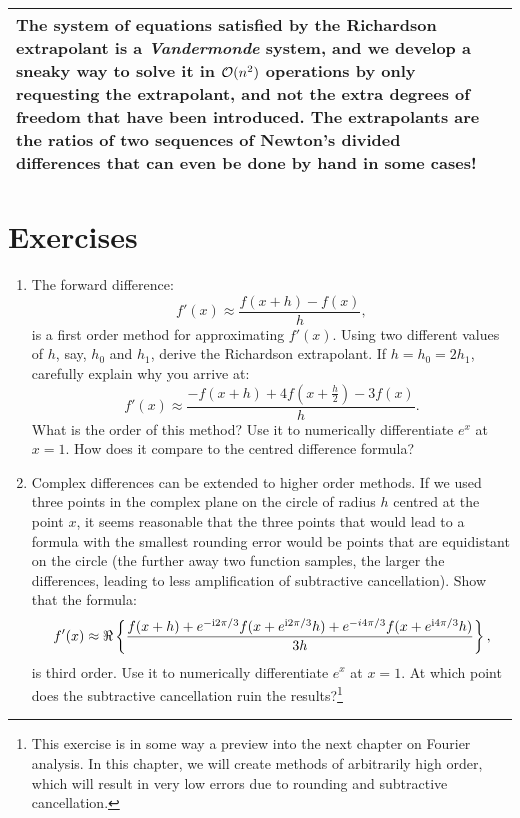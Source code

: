 \documentclass[11pt,letterpaper]{article}
\begin{document}
\begin{longtable}{p{}|p{}}
The system of equations satisfied by the Richardson extrapolant is a {\em Vandermonde} system, and we develop a sneaky way to solve it in $\mathcal{O}(n^2)$ operations by only requesting the extrapolant, and not the extra degrees of freedom that have been introduced. The extrapolants are the ratios of two sequences of Newton's divided differences that can even be done by hand in some cases!\\

\hline
\end{longtable}

\section*{Exercises}

\begin{enumerate}

\item The forward difference:
\[
f'(x) \approx \dfrac{f(x+h)-f(x)}{h},
\]
is a first order method for approximating $f'(x)$. Using two different values of $h$, say, $h_0$ and $h_1$, derive the Richardson extrapolant. If $h = h_0 = 2h_1$, carefully explain why you arrive at:
\[
f'(x) \approx \dfrac{-f(x+h)+4f(x+\tfrac{h}{2})-3f(x)}{h}.
\]
What is the order of this method? Use it to numerically differentiate $e^x$ at $x=1$. How does it compare to the centred difference formula?

\item Complex differences can be extended to higher order methods. If we used three points in the complex plane on the circle of radius $h$ centred at the point $x$, it seems reasonable that the three points that would lead to a formula with the smallest rounding error would be points that are equidistant on the circle (the further away two function samples, the larger the differences, leading to less amplification of subtractive cancellation). Show that the formula:
\[
f'(x) \approx \Re\left\{\dfrac{f(x+h)+e^{-{\rm i} 2\pi/3}f(x+e^{{\rm i}2\pi/3}h) + e^{-i4\pi/3}f(x+e^{{\rm i}4\pi/3}h)}{3h}\right\},
\]
is third order. Use it to numerically differentiate $e^x$ at $x=1$. At which point does the subtractive cancellation ruin the results?\footnote{This exercise is in some way a preview into the next chapter on Fourier analysis. In this chapter, we will create methods of arbitrarily high order, which will result in very low errors due to rounding and subtractive cancellation.}


\end{enumerate}
\end{document}
